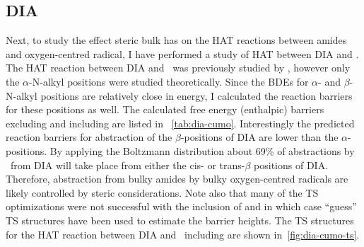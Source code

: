 \begin{doublespace}
\subsection{DIA}

Next, to study the effect steric bulk has on the HAT reactions between amides
and oxygen-centred radical, I have performed a study of HAT between DIA and
\cumo. The HAT reaction between DIA and \cumo\ was previously studied by
\citet{Salamone2014}, however only the $\alpha$-N-alkyl positions were studied
theoretically. Since the BDEs for $\alpha$- and $\beta$-N-alkyl 
positions are relatively close in energy, I calculated the reaction barriers
for these positions as well. The calculated free energy (enthalpic) barriers
excluding and including  are listed in ~\ref{tab:dia-cumo}.
Interestingly the predicted reaction barriers for abstraction of the
$\beta$-positions of DIA are lower than the $\alpha$-positions. By applying the
Boltzmann distribution about 69\% of abstractions by \cumo\ from DIA will take
place from either the cis- or trans-$\beta$ positions of DIA. Therefore,
abstraction from bulky amides by bulky oxygen-centred radicals are likely
controlled by steric considerations. Note also that many of the TS
optimizations were not successful with the inclusion of  and in which
case ``guess'' TS structures have been used to estimate the barrier heights.
The TS structures for the HAT reaction between DIA and \cumo\ including
 are shown in~\ref{fig:dia-cumo-ts}.


\end{doublespace}
